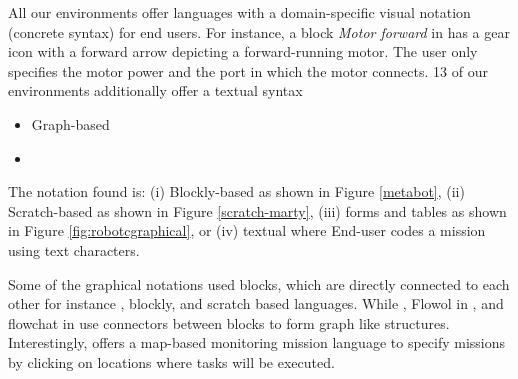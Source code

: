  All our environments offer languages with a domain-specific visual notation (concrete syntax) for end users. For instance, a block \emph{Motor forward} in \trik has a gear icon with a forward arrow depicting a forward-running motor. The user only specifies the motor power and the port in which the motor connects. 13 of our environments additionally offer a textual syntax

\begin{itemize}
	\item Graph-based
	\item 
\end{itemize}

The notation found is: (i) Blockly-based as shown in Figure \ref{metabot}, (ii) Scratch-based as shown in Figure
	\ref{scratch-marty}, (iii) forms and tables as shown in Figure \ref{fig:robotcgraphical}, or (iv) textual where End-user codes a mission using text characters.


Some of the graphical notations used blocks, which are directly connected to each other for instance \trik, blockly, and scratch based languages. While \choregraphe, Flowol in \robotmesh, and flowchat in \picaxe use connectors between blocks to form graph like structures. %
Interestingly, \flyaq offers a map-based 
monitoring mission language to specify missions by clicking on locations where tasks will be executed. 

